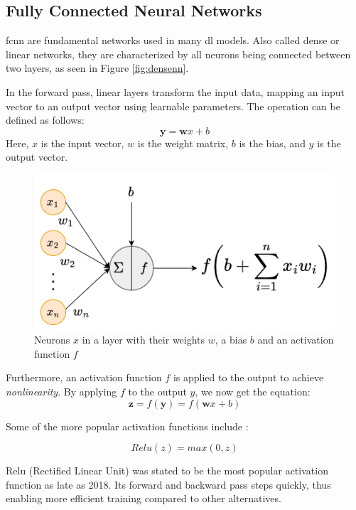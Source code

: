 \subsection{Fully Connected Neural Networks}
\label{back:linear}

\acrfull{fcnn} are fundamental networks used in many \acrshort{dl} models. Also called dense or linear networks, they are characterized by all neurons being connected between two layers, as seen in Figure \ref{fig:densenn}. 

In the forward pass, linear layers transform the input data, mapping an input vector to an output vector using learnable parameters. The operation can be defined as follows:
\begin{equation}\label{f:wxb}
    \mathbf{y} = \mathbf{w}x+b
\end{equation}
Here, $x$ is the input vector, \textbf{$w$} is the weight matrix, $b$ is the bias, and \textbf{$y$} is the output vector.

\begin{figure}[!h]
    \centering
    \includegraphics[width=0.7\linewidth]{figures/dl.png}
    \caption{Neurons $x$ in a layer with their weights $w$, a bias $b$ and an activation function $f$}
    \label{fig:dl}
\end{figure}

Furthermore, an activation function $f$ is applied to the output to achieve \textit{nonlinearity}. By applying $f$ to the output $y$, we now get the equation:
\begin{equation}\label{f:fwxb}
    \mathbf{z} = f(\mathbf{y}) = f(\mathbf{w}x+b)
\end{equation}

Some of the more popular activation functions include \cite{szandala2021review}: 

\begin{equation}
    Relu(z) = max(0, z)
\end{equation}

Relu (Rectified Linear Unit) was stated to be the most popular activation function as late as 2018. Its forward and backward pass steps quickly, thus enabling more efficient training compared to other alternatives.

